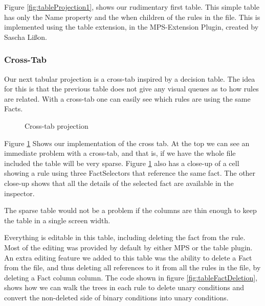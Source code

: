 Figure \ref{fig:tableProjection1}, shows our rudimentary first table.
This simple table has only the Name property and the when children of the rules in the file.
This is implemented using the table extension, in the MPS-Extension Plugin, created by Sascha Lißon.

\subsubsection{Cross-Tab}
Our next tabular projection is a cross-tab inspired by a decision table.
The idea for this is that the previous table does not give any visual queues as to how rules are related.
With a cross-tab one can easily see which rules are using the same Facts.

\begin{figure}[h]
    \centering
    \caption{Cross-tab projection}
    \label{fig:crosstabProjection1}
\end{figure}

Figure \ref{fig:crosstabProjection1} Shows our implementation of the cross tab.
At the top we can see an immediate problem with a cross-tab, and that is, if we have the whole file included the table will be very sparse.
Figure \ref{fig:crosstabProjection1} also has a close-up of a cell showing a rule using three FactSelectors that reference the same fact.
The other close-up shows that all the details of the selected fact are available in the inspector.

The sparse table would not be a problem if the columns are thin enough to keep the table in a single screen width.

Everything is editable in this table, including deleting the fact from the rule.
Most of the editing was provided by default by either MPS or the table plugin.
An extra editing feature we added to this table was the ability to delete a Fact from the file, and thus deleting all references to it from all the rules in the file, by deleting a Fact column column.
The code shown in figure \ref{fig:tableFactDeletion}, shows how we can walk the trees in each rule to delete unary conditions and convert the non-deleted side of binary conditions into unary conditions.

